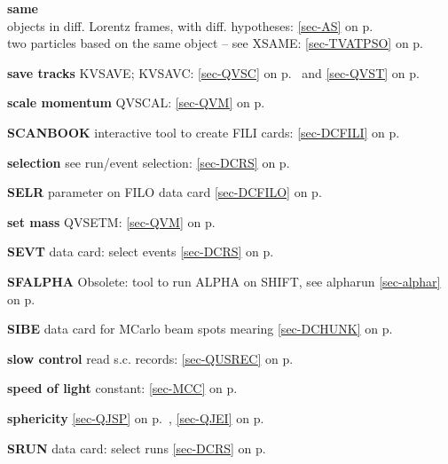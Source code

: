  \item{\bf same}\\
 \subitem objects in diff. Lorentz frames, with diff. hypotheses:
 \ref{sec-AS} on p.~\pageref{sec-AS}\\
 \subitem  two particles based on the same object -- see
 XSAME:
 \ref{sec-TVATPSO} on p.~\pageref{sec-TVATPSO}\\
 \item{\bf save tracks }KVSAVE; KVSAVC: \ref{sec-QVSC} on p.~\pageref{sec-QVSC} and
 \ref{sec-QVST} on p.~\pageref{sec-QVST}\\
 \item{\bf scale momentum  }QVSCAL: \ref{sec-QVM} on p.~\pageref{sec-QVM}\\
 \item{\bf SCANBOOK  }interactive tool to create FILI cards: \ref{sec-DCFILI} on p.~\pageref{sec-DCFILI}\\
 \item{\bf selection   }see run/event selection: \ref{sec-DCRS} on p.~\pageref{sec-DCRS}\\
 \item{\bf SELR    }parameter on FILO data card \ref{sec-DCFILO} on p.~\pageref{sec-DCFILO}\\
 \item{\bf set mass    }QVSETM: \ref{sec-QVM} on p.~\pageref{sec-QVM}\\
 \item{\bf SEVT    }data card: select events \ref{sec-DCRS} on p.~\pageref{sec-DCRS}\\
 \item{\bf SFALPHA   }Obsolete: tool to run ALPHA on SHIFT, see alpharun
 \ref{sec-alphar} on p.~\pageref{sec-alphar}\\
 \item{\bf SIBE    }data card for MCarlo beam spots mearing \ref{sec-DCHUNK} on p.~\pageref{sec-DCHUNK}\\
 \item{\bf slow control }read s.c. records: \ref{sec-QUSREC} on p.~\pageref{sec-QUSREC}\\
 \item{\bf speed of light  }constant: \ref{sec-MCC} on p.~\pageref{sec-MCC}\\
 \item{\bf sphericity }\ref{sec-QJSP} on p.~\pageref{sec-QJSP}, \ref{sec-QJEI}
 on p.~\pageref{sec-QJEI}\\
 \item{\bf SRUN    }data card: select runs \ref{sec-DCRS} on p.~\pageref{sec-DCRS}\\
